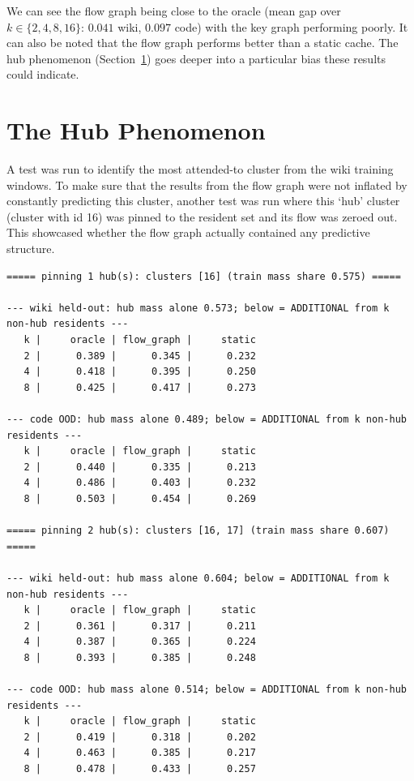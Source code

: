 \documentclass[11pt,a4paper]{article}
\begin{document}
We can see the flow graph being close to the oracle (mean gap over $k \in \{2,4,8,16\}$: $0.041$ wiki, $0.097$ code) with the key graph performing poorly. It can also be noted that the flow graph performs better than a static cache. The hub phenomenon (Section~\ref{sec:hub}) goes deeper into a particular bias these results could indicate.


\section{The Hub Phenomenon}\label{sec:hub}

A test was run to identify the most attended-to cluster from the wiki training windows. To make sure that the results from the flow graph were not inflated by constantly predicting this cluster, another test was run where this `hub' cluster (cluster with id 16) was pinned to the resident set and its flow was zeroed out. This showcased whether the flow graph actually contained any predictive structure.

{\footnotesize
\begin{verbatim}
===== pinning 1 hub(s): clusters [16] (train mass share 0.575) =====

--- wiki held-out: hub mass alone 0.573; below = ADDITIONAL from k non-hub residents ---
   k |     oracle | flow_graph |     static
   2 |      0.389 |      0.345 |      0.232
   4 |      0.418 |      0.395 |      0.250
   8 |      0.425 |      0.417 |      0.273

--- code OOD: hub mass alone 0.489; below = ADDITIONAL from k non-hub residents ---
   k |     oracle | flow_graph |     static
   2 |      0.440 |      0.335 |      0.213
   4 |      0.486 |      0.403 |      0.232
   8 |      0.503 |      0.454 |      0.269

===== pinning 2 hub(s): clusters [16, 17] (train mass share 0.607) =====

--- wiki held-out: hub mass alone 0.604; below = ADDITIONAL from k non-hub residents ---
   k |     oracle | flow_graph |     static
   2 |      0.361 |      0.317 |      0.211
   4 |      0.387 |      0.365 |      0.224
   8 |      0.393 |      0.385 |      0.248

--- code OOD: hub mass alone 0.514; below = ADDITIONAL from k non-hub residents ---
   k |     oracle | flow_graph |     static
   2 |      0.419 |      0.318 |      0.202
   4 |      0.463 |      0.385 |      0.217
   8 |      0.478 |      0.433 |      0.257
\end{verbatim}
}
\end{document}
